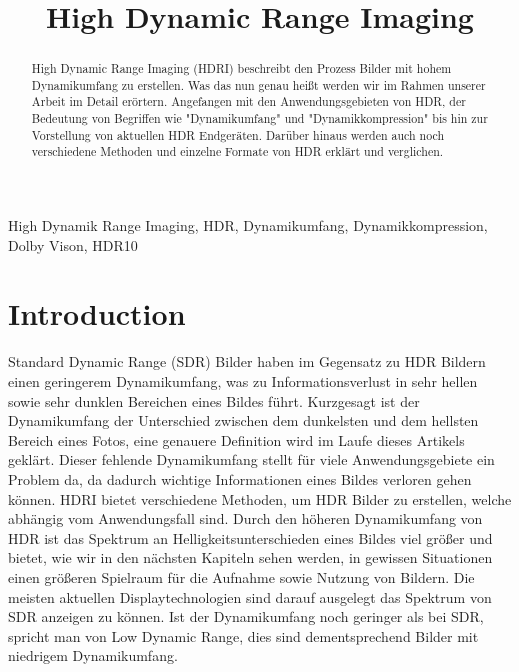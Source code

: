 \documentclass[conference]{IEEEtran}
\begin{document}
\title{High Dynamic Range Imaging}

\author{
\and
{}
}

\maketitle

\begin{abstract}
High Dynamic Range Imaging (HDRI) beschreibt den Prozess Bilder mit hohem Dynamikumfang zu erstellen. Was das nun genau heißt werden wir im Rahmen unserer Arbeit im Detail erörtern. Angefangen mit den Anwendungsgebieten von HDR, der Bedeutung von Begriffen wie "Dynamikumfang" und "Dynamikkompression" bis hin zur Vorstellung von aktuellen HDR Endgeräten. Darüber hinaus werden auch noch verschiedene Methoden und einzelne Formate von HDR erklärt und verglichen.
\end{abstract}

\begin{IEEEkeywords}
High Dynamik Range Imaging, HDR, Dynamikumfang, Dynamikkompression, Dolby Vison, HDR10
\end{IEEEkeywords}

\section{Introduction}
	Standard Dynamic Range (SDR) Bilder haben im Gegensatz zu HDR Bildern einen geringerem Dynamikumfang, was zu Informationsverlust in sehr hellen sowie sehr dunklen Bereichen eines Bildes führt. Kurzgesagt ist der Dynamikumfang der Unterschied zwischen dem dunkelsten und dem hellsten Bereich eines Fotos, eine genauere Definition wird im Laufe dieses Artikels geklärt. Dieser fehlende Dynamikumfang stellt für viele Anwendungsgebiete ein Problem da, da dadurch wichtige Informationen eines Bildes verloren gehen können. HDRI bietet verschiedene Methoden, um HDR Bilder zu erstellen, welche abhängig vom Anwendungsfall sind. Durch den höheren Dynamikumfang von HDR ist das Spektrum an Helligkeitsunterschieden eines Bildes viel größer und bietet, wie wir in den nächsten Kapiteln sehen werden, in gewissen Situationen einen größeren Spielraum für die Aufnahme sowie Nutzung von Bildern. Die meisten aktuellen Displaytechnologien sind darauf ausgelegt das Spektrum von SDR anzeigen zu können. Ist der Dynamikumfang noch geringer als bei SDR, spricht man von Low Dynamic Range, dies sind dementsprechend Bilder mit niedrigem Dynamikumfang.
\end{document}
